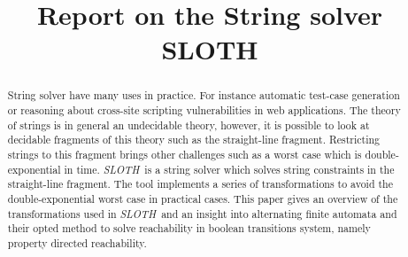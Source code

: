 \documentclass[letterpaper, 10pt, conference]{IEEEtran}
\newcommand{\sloth}{\emph{SLOTH}~}
\begin{document}
\title{Report on the String solver SLOTH}

\author{
}



\maketitle


\begin{abstract}
String solver have many uses in practice. For instance automatic test-case generation or reasoning about cross-site scripting vulnerabilities in web applications. The theory of strings is in general an undecidable theory, however, it is possible to look at decidable fragments of this theory such as the straight-line fragment. Restricting strings to this fragment brings other challenges such as a worst case which is double-exponential in time. \sloth is a string solver which solves string constraints in the straight-line fragment. The tool implements a series of transformations to avoid the double-exponential worst case in practical cases. This paper gives an overview of the transformations used in \sloth and an insight into alternating finite automata and their opted method to solve reachability in boolean transitions system, namely property directed reachability.


\end{abstract}

















%
%
\end{document}
